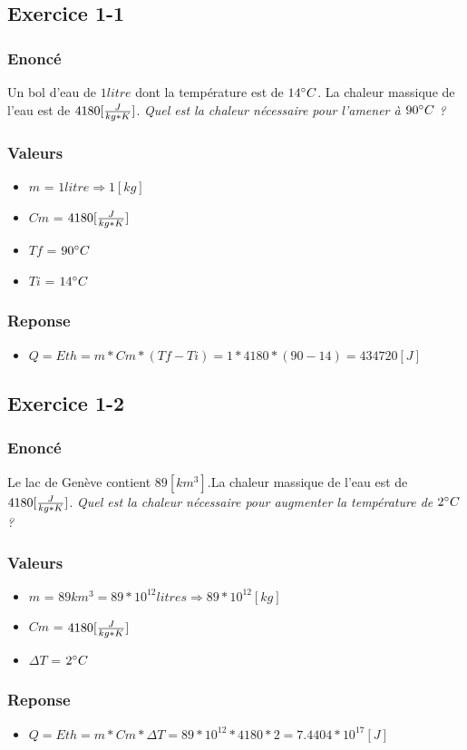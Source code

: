 \subsection{Exercice 1-1}
\subsubsection{Enoncé}
Un bol d'eau de $1 litre$ dont la température est de $14\celsius$. La chaleur massique de l'eau est de $4180[\cm]$.
\textit{Quel est la chaleur nécessaire pour l'amener à $90\celsius$ ?}
\subsubsection{Valeurs}
\begin{itemize}
    \item $m$ = $1 litre \Rightarrow 1[kg]$
    \item $Cm$ = $4180[\cm]$
    \item $Tf$ = $90\celsius$
    \item $Ti$ = $14\celsius$
\end{itemize}
\subsubsection{Reponse}
\begin{itemize}
    \item $Q = Eth = m * Cm * (Tf-Ti) = 1*4180*(90-14) = 434720[J]$
\end{itemize}

\subsection{Exercice 1-2}
\subsubsection{Enoncé}
 Le lac de Genève contient $89[km^3]$.La chaleur massique de l'eau est de $4180[\cm]$.
\textit{Quel est la chaleur nécessaire pour augmenter la température de $2\celsius$ ?}
\subsubsection{Valeurs}
\begin{itemize}
    \item $m$ = $89km^3 = 89*10^{12} litres \Rightarrow 89*10^{12}[kg]$
    \item $Cm$ = $4180[\cm]$
    \item ${\Delta}T$ = $2\celsius$
\end{itemize}
\subsubsection{Reponse}
\begin{itemize}
    \item $Q = Eth = m * Cm * {\Delta}T = 89*10^{12}*4180*2 = 7.4404*10^{17}[J]$
\end{itemize}
